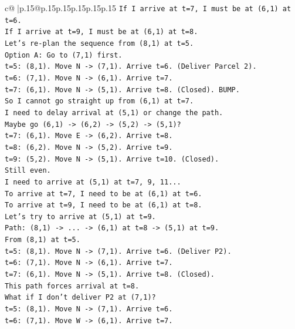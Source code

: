 \documentclass{article}
\begin{document}
{\begin{supertabular}{c@{$\;$}|p{.15\linewidth}@{}p{.15\linewidth}p{.15\linewidth}p{.15\linewidth}p{.15\linewidth}p{.15\linewidth}}
{{{\texttt{If I arrive at t=7, I must be at (6,1) at t=6.} \\
\texttt{If I arrive at t=9, I must be at (6,1) at t=8.} \\
\texttt{Let's re{-}plan the sequence from (8,1) at t=5.} \\
\texttt{Option A: Go to (7,1) first.} \\
\texttt{t=5: (8,1). Move N {-}> (7,1). Arrive t=6. (Deliver Parcel 2).} \\
\texttt{t=6: (7,1). Move N {-}> (6,1). Arrive t=7.} \\
\texttt{t=7: (6,1). Move N {-}> (5,1). Arrive t=8. (Closed). BUMP.} \\
\texttt{So I cannot go straight up from (6,1) at t=7.} \\
\texttt{I need to delay arrival at (5,1) or change the path.} \\
\texttt{Maybe go (6,1) {-}> (6,2) {-}> (5,2) {-}> (5,1)?} \\
\texttt{t=7: (6,1). Move E {-}> (6,2). Arrive t=8.} \\
\texttt{t=8: (6,2). Move N {-}> (5,2). Arrive t=9.} \\
\texttt{t=9: (5,2). Move N {-}> (5,1). Arrive t=10. (Closed).} \\
\texttt{Still even.} \\
\texttt{I need to arrive at (5,1) at t=7, 9, 11...} \\
\texttt{To arrive at t=7, I need to be at (6,1) at t=6.} \\
\texttt{To arrive at t=9, I need to be at (6,1) at t=8.} \\
\texttt{Let's try to arrive at (5,1) at t=9.} \\
\texttt{Path: (8,1) {-}> ... {-}> (6,1) at t=8 {-}> (5,1) at t=9.} \\
\texttt{From (8,1) at t=5.} \\
\texttt{t=5: (8,1). Move N {-}> (7,1). Arrive t=6. (Deliver P2).} \\
\texttt{t=6: (7,1). Move N {-}> (6,1). Arrive t=7.} \\
\texttt{t=7: (6,1). Move N {-}> (5,1). Arrive t=8. (Closed).} \\
\texttt{This path forces arrival at t=8.} \\
\texttt{What if I don't deliver P2 at (7,1)?} \\
\texttt{t=5: (8,1). Move N {-}> (7,1). Arrive t=6.} \\
\texttt{t=6: (7,1). Move W {-}> (6,1). Arrive t=7.} \\
}}}
\end{supertabular}}
\end{document}
